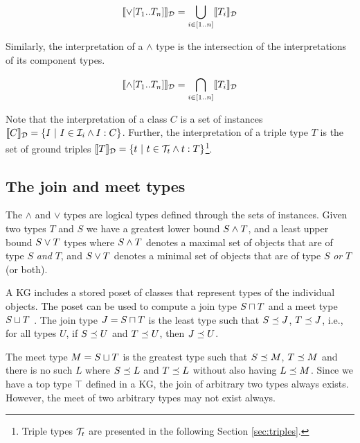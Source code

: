 \documentclass[runningheads]{llncs}
\newcommand{\I}{{\cal I}}
\newcommand{\T}{{\cal T}}
\newcommand{\memo}[1]{}
\begin{document}
\begin{displaymath}
  \llbracket\lor[T_1..T_n]\rrbracket_{\cal D} = \bigcup_{i\in[1..n]}\llbracket\/T_i\rrbracket_{\cal D}
\end{displaymath}

Similarly, the interpretation of a $\land$ type is the intersection of
the interpretations of its component types.

\begin{displaymath}
\llbracket\land[T_1..T_n]\rrbracket_{\cal D} = \bigcap_{i\in[1..n]}\llbracket\/T_i\rrbracket_{\cal D}
\end{displaymath}

Note that the interpretation of a class $C$ is a set of instances
$\llbracket\/C\rrbracket_\D=\{I\ |\ I\in\I_i\land\/I:C\}$. Further, the
interpretation of a triple type $T$ is the set of ground triples
$\llbracket\/T\rrbracket_\D=\{t\ |\ t\in\T_t\land\/t:T\}$\footnote{Triple
  types $\T_t$ are presented in the following Section
  \ref{sec:triples}.}\cite{Savnik2025}.

\memo{Put together the base types of ground identifiers using $\land$ type.}
\memo{First, the base type of an ground identifier is the $\land$ of all base types.}
\memo{The \emph{base type} of a ground identifier is defined explicitely!}





\subsection{The join and meet types}

The $\land$ and $\lor$ types are logical types defined through the
sets of instances. Given two types $T$ and $S$ we have a greatest
lower bound $S\land\/T$, and a least upper bound $S\lor\/T$ types
where $S\land\/T$ denotes a maximal set of objects that are of type
$S$ \emph{and} $T$, and $S\lor\/T$ denotes a minimal set of objects
that are of type $S$ \emph{or} $T$ (or both).

A KG includes a stored poset of classes that represent types of the
individual objects. The poset can be used to compute a join type
$S\sqcap\/T$ and a meet type $S\sqcup\/T$ \cite{Pierce2002}. The join
type $J=S\sqcap\/T$ is the least type such that $S\preceq\/J$,
$T\preceq\/J$, i.e., for all types $U$, if $S\preceq\/U$ and
$T\preceq\/U$, then $J\preceq\/U$.

The meet type $M=S\sqcup\/T$ is the greatest type such that
$S\preceq\/M$, $T\preceq\/M$ and there is no such $L$ where
$S\preceq\/L$ and $T\preceq\/L$ without also having $L\preceq\/M$.
Since we have a top type $\top$ defined in a KG, the join of arbitrary
two types always exists. However, the meet of two arbitrary types may
not exist always. 
\end{document}
